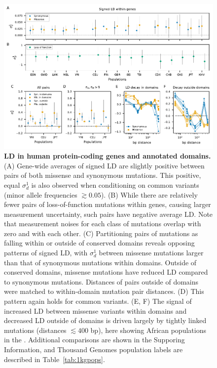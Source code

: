 \documentclass[]{article}
\begin{document}
\begin{figure}[tb!]
    \centering
    \includegraphics{../figures/data_compact}
    \caption{
        \textbf{LD in human protein-coding genes and annotated domains.}
        (A) Gene-wide averages of signed LD are slightly positive between pairs
        of both missense and synonymous mutations. This positive, equal
        \(\sigma_d^1\) is also observed when conditioning on common variants
        (minor allele frequencies \(\gtrsim 0.05\)).
        (B) While there are relatively fewer pairs of loss-of-function mutations
        within genes, causing larger measurement uncertainty, such pairs have
        negative average LD. Note that measurement noises for each class of
        mutations overlap with zero and with each other.
        (C) Partitioning pairs of mutations as falling within or outside
        of conserved domains reveals opposing patterns of signed LD, with
        \(\sigma_d^1\) between missense mutations larger than that of synonymous
        mutations within domains. Outside of conserved domains, missense mutations
        have reduced LD compared to synonymous mutations. Distances of pairs outside
        of domains were matched to within-domain mutation pair distances.
        (D) This pattern again holds for common variants.
        (E, F) The signal of increased LD between missense variants within domains
        and decreased LD outside of domains is driven largely by tightly linked
        mutations (distances \(\lesssim 400\) bp), here showing African populations
        in the \citet{1000_Genomes_Project_Consortium2015-zq}.
        Additional comparisons are shown in the Supporing Information, and Thousand
        Genomes population labels are described in Table~\ref{tab:1kgpops}.
    }
    \label{fig:data}
\end{figure}
\end{document}
